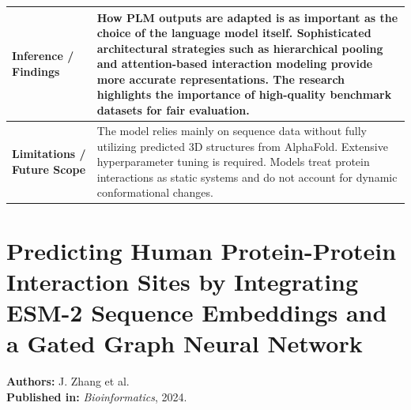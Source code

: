 \documentclass[12pt,a4paper]{report}
\begin{document}
\begin{table}[H]
\centering
\renewcommand{\arraystretch}{1.5}
\begin{tabular}{|p{}|p{}|}
\hline
\textbf{Inference / Findings} & How PLM outputs are adapted is as important as the choice of the language model itself. Sophisticated architectural strategies such as hierarchical pooling and attention-based interaction modeling provide more accurate representations. The research highlights the importance of high-quality benchmark datasets for fair evaluation. \\ \hline
\textbf{Limitations / Future Scope} & The model relies mainly on sequence data without fully utilizing predicted 3D structures from AlphaFold. Extensive hyperparameter tuning is required. Models treat protein interactions as static systems and do not account for dynamic conformational changes. \\ \hline
\end{tabular}
\end{table}

\newpage

\section{Predicting Human Protein-Protein Interaction Sites by Integrating ESM-2 Sequence Embeddings and a Gated Graph Neural Network}
\textbf{Authors:} J. Zhang et al. \\
\textbf{Published in:} \textit{Bioinformatics}, 2024.
\end{document}
